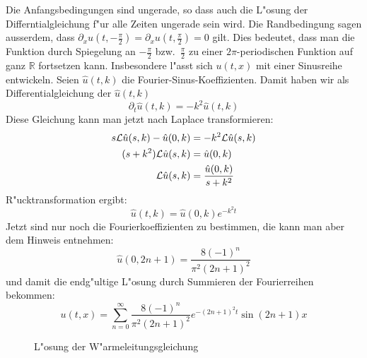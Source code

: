 \begin{loesung}
Die Anfangsbedingungen sind ungerade, so dass auch die L"osung der
Differntialgleichung f"ur alle Zeiten ungerade sein wird. Die
Randbedingung sagen ausserdem, dass
$\partial_xu(t,-\frac{\pi}2)=\partial_xu(t,\frac{\pi}2)=0$ gilt.
Dies bedeutet, dass man die Funktion durch Spiegelung an
$-\frac{\pi}2$ bzw.~$\frac{\pi}2$ zu einer $2\pi$-periodischen
Funktion auf ganz $\mathbb R$ fortsetzen kann. Insbesondere l"asst
sich $u(t,x)$ mit einer Sinusreihe entwickeln. Seien $\hat u(t,k)$
die Fourier-Sinus-Koeffizienten. Damit haben wir als Differentialgleichung
der $\hat u(t,k)$
\[
\partial_t\hat u(t,k)=-k^2\hat u(t,k)
\]
Diese Gleichung kann man jetzt nach Laplace transformieren:
\begin{align*}
s{\cal L}\hat u(s,k) - \hat u(0,k)&=-k^2 {\cal L}\hat u(s,k)\\
(s+k^2){\cal L}\hat u(s,k)&=\hat u(0,k)\\
{\cal L}\hat u(s,k)&=\frac{\hat u(0,k)}{s+k^2}
\end{align*}
R"ucktransformation ergibt:
\[
\hat u(t,k)=\hat u(0,k) e^{-k^2t}
\]
Jetzt sind nur noch die Fourierkoeffizienten zu bestimmen, die kann
man aber dem Hinweis entnehmen:
\[
\hat u(0,2n+1)=
\frac{8(-1)^n}{\pi^2(2n+1)^2}
\]
und damit die endg"ultige L"osung durch Summieren der Fourierreihen bekommen:
\[
u(t,x)=
\sum_{n=0}^\infty \frac{8(-1)^n}{\pi^2(2n+1)^2}e^{-(2n+1)^2t}\sin(2n+1)x
\]
\begin{figure}
\begin{center}
\end{center}
\caption{L"osung der W"armeleitungsgleichung}
\end{figure}
\end{loesung}
